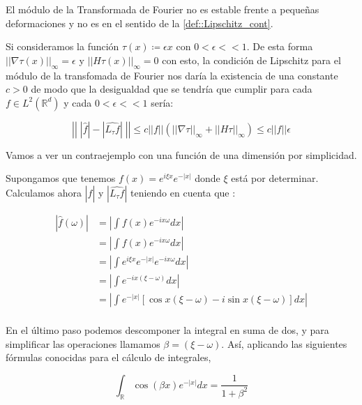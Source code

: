 \begin{observacion}\label{lemma:TF_inestable_difeomorfismos}
  El módulo de la Transformada de Fourier no es estable frente a pequeñas deformaciones y no es  en el sentido de la \autoref{def::Lipschitz_cont}.

  \medskip

  \noindent Si consideramos la función $\tau(x)\coloneqq \epsilon x$ con $0 < \epsilon << 1$. De esta forma $||\nabla \tau (x) ||_\infty = \epsilon$ y $||H\tau(x)||_\infty=0$ con esto, la condición de Lipschitz para el módulo de la transfomada de Fourier nos daría la existencia de una constante $c>0$ de modo que la desigualdad que se tendría que cumplir para cada $f \in L^2(\mathbb{R}^d)$ y cada $0 < \epsilon << 1$ sería:

  $$\left|\left| \; |\widehat{f}| -|\widehat{L_\tau f}| \; \right|\right| \leq c ||f|| (||\nabla \tau ||_{\infty} + ||H\tau||_\infty) \leq c ||f|| \epsilon$$

  \noindent Vamos a ver un contraejemplo con una función de una dimensión por simplicidad.

  \medskip

  \noindent Supongamos que tenemos $f(x)=e^{i \xi x}e^{-|x|}$ donde $\xi$ está por determinar. Calculamos ahora $|\widehat{f}|$ y $|\widehat{L_\tau f}|$ teniendo en cuenta que :


  \begin{align*}
    |\widehat{f}(\omega)|&=\left|  \int{f(x)e^{-ix\omega}dx}  \right | \\
    &=\left|  \int{f(x)e^{-ix\omega}dx}  \right | \\
    &=\left|  \int{e^{i \xi x}e^{-|x|}e^{-ix\omega}dx}  \right | \\
    &=\left|  \int{e^{-ix(\xi-\omega)}dx}  \right | \\
    &=\left|  \int{e^{-|x|}\left[\cos{x(\xi-\omega)} -i\sin{x(\xi-\omega)}\right]dx} \right| \\
  \end{align*}

  \noindent En el último paso podemos descomponer la integral en suma de dos, y para simplificar las operaciones llamamos $\beta=(\xi - \omega)$. Así, aplicando las siguientes fórmulas conocidas para el cálculo de integrales,


  \begin{equation} \label{eq:res_auxiliar_1}
    \int_\mathbb{R} \cos(\beta x) e^{-|x|} dx= \frac{1}{1+\beta^2}
  \end{equation}


\end{observacion}
